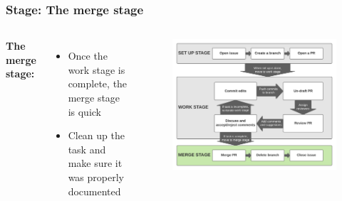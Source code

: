 \documentclass[aspectratio=169]{beamer} %
\begin{document}
\begin{frame}
	\frametitle{Stage: The merge stage}
	\begin{columns}[c]


		\Large \textbf{The merge stage:}
		\vspace{1em}
		\normalsize
		\begin{itemize}
			\setlength\itemsep{.5em}
			\item Once the work stage is complete, the merge stage is quick
			\item Clean up the task and make sure it was properly documented
		\end{itemize}

		\vspace{-.75cm}
		\begin{figure}
			\centering
			\includegraphics[width=\textwidth]{./img/branch-pr-merge-cycle-S3.png}
		\end{figure}

	\end{columns}
\end{frame}
\end{document}
